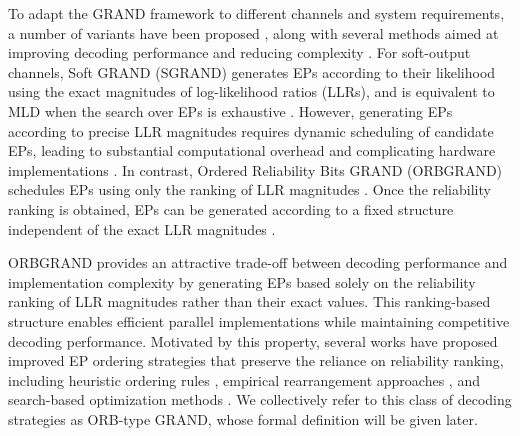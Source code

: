 \documentclass[letterpaper,draftclsnofoot,onecolumn]{IEEEtran}
\begin{document}





To adapt the GRAND framework to different channels and system requirements, a number of variants have been proposed \cite{solomon2020SGRAND, duffy2021SRGRAND, abbas2022grand, duffy2023using, sarieddeen2022grand, feng2024laplacian}, along with several methods aimed at improving decoding performance and reducing complexity \cite{condo2021high, yuan2023guessing}. 
For soft-output channels, Soft GRAND (SGRAND) generates EPs according to their likelihood using the exact magnitudes of log-likelihood ratios (LLRs), and is equivalent to MLD when the search over EPs is exhaustive \cite{solomon2020SGRAND, Lin2004ErrorCC}. However, generating EPs according to precise LLR magnitudes requires dynamic scheduling of candidate EPs, leading to substantial computational overhead and complicating hardware implementations \cite{wan2025parallelism}. In contrast, Ordered Reliability Bits GRAND (ORBGRAND) schedules EPs using only the ranking of LLR magnitudes \cite{duffy2022ORBGRAND}. Once the reliability ranking is obtained, EPs can be generated according to a fixed structure independent of the exact LLR magnitudes \cite{an2023soft, galligan2023block, abbas2022high, abbas2023guessing, ji2024efficient}.




ORBGRAND provides an attractive trade-off between decoding performance and implementation complexity by generating EPs based solely on the reliability ranking of LLR magnitudes rather than their exact values. This ranking-based structure enables efficient parallel implementations while maintaining competitive decoding performance. Motivated by this property, several works have proposed improved EP ordering strategies that preserve the reliance on reliability ranking, including heuristic ordering rules \cite{duffy2022ORBGRAND, condo2021high, wang2023improved}, empirical rearrangement approaches \cite{condo2022fixed}, and search-based optimization methods \cite{wan2024approaching}. We collectively refer to this class of decoding strategies as ORB-type GRAND, whose formal definition will be given later.
\end{document}
